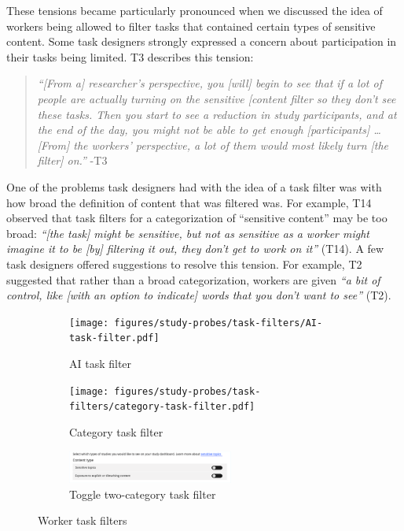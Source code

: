 These tensions became particularly pronounced when we discussed the idea of workers being allowed to filter tasks that contained certain types of sensitive content. Some task designers strongly expressed a concern about participation in their tasks being limited. T3 describes this tension:
\begin{quote}
    \textit{``[From a] researcher's perspective, you [will] begin to see that if a lot of people are actually turning on the sensitive [content filter so they don't see these tasks. Then you start to see a reduction in study participants, and at the end of the day, you might not be able to get enough [participants] \dots [From] the workers' perspective,  a lot of them would most likely turn [the filter] on.''} -T3
\end{quote} 
One of the problems task designers had with the idea of a task filter was with how broad the definition of content that was filtered was. For example, T14 observed that task filters for a categorization of ``sensitive content'' may be too broad: \textit{``[the task] might be sensitive, but not as sensitive as a worker might imagine it to be [by] filtering it out, they don't get to work on it''} (T14). A few task designers offered suggestions to resolve this tension. For example, T2 suggested that rather than a broad categorization, workers are given \textit{``a bit of control, like [with an option to indicate] words that you don't want to see''} (T2).


\begin{figure}
    \centering
    \begin{subfigure}[b]{0.48\textwidth}
        \centering
        \texttt{[image: figures/study-probes/task-filters/AI-task-filter.pdf]} 
        \caption{AI task filter}
    \end{subfigure}
    \hfill
    \begin{subfigure}[b]{0.48\textwidth}
        \centering
        \texttt{[image: figures/study-probes/task-filters/category-task-filter.pdf]} 
        \caption{Category task filter}
    \end{subfigure}
    \vspace{1em} %
    \begin{subfigure}[b]{0.98\textwidth}
        \centering
        \includegraphics[width=0.6\textwidth]{figures/study-probes/task-filters/toggle-task-filter.pdf}
        \caption{Toggle two-category task filter}
    \end{subfigure}
    \caption{Worker task filters}
    \label{fig:worker-task-filters}
\end{figure}

